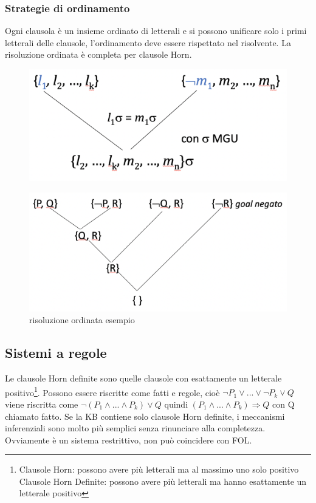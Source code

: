 \documentclass{article}
\begin{document}
\subsubsection{Strategie di ordinamento}
Ogni clausola è un insieme ordinato di letterali e si possono unificare solo i primi letterali delle clausole, l’ordinamento deve essere rispettato nel risolvente. La risoluzione ordinata è completa per clausole Horn.
\begin{figure}[H]
\centering
\includegraphics[scale=0.4]{Images/risoluzioneordinata.png}
\end{figure}
\begin{figure}[H]
\centering
\includegraphics[scale=0.4]{Images/risoluzioneordinataesempio.png}
\caption{risoluzione ordinata esempio}
\end{figure}

\subsection{Sistemi a regole}
Le clausole Horn definite sono quelle clausole con esattamente un letterale positivo\footnote{Clausole Horn: possono avere più letterali ma al massimo uno solo positivo \newline Clausole Horn Definite: possono avere più letterali ma hanno esattamente un letterale positivo}. Possono essere riscritte come fatti e regole, cioè \newline
$\neg P_1 \lor ... \lor \neg P_k \lor Q$ \quad viene riscritta come \newline
$\neg (P_1 \land ... \land P_k) \lor Q$ \quad quindi \newline
$(P_1 \land ... \land P_k) \Rightarrow Q$ \quad con Q chiamato fatto. \newline
Se la KB contiene solo clausole Horn definite, i meccanismi inferenziali sono molto più semplici senza rinunciare alla completezza. Ovviamente è un sistema restrittivo, non può coincidere con FOL.
\end{document}
